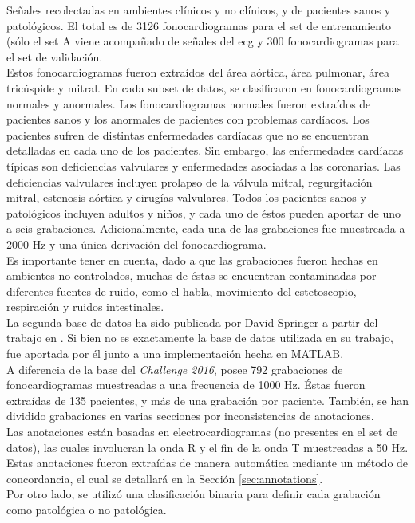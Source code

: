 \indent Señales recolectadas en ambientes clínicos y no clínicos, y de pacientes sanos y patológicos. El total es de 3126 fonocardiogramas para el set de entrenamiento (sólo el set A viene acompañado de señales del \acrshort{ecg} y 300 fonocardiogramas para el set de validación. \\
\indent Estos fonocardiogramas fueron extraídos del área aórtica, área pulmonar, área tricúspide y mitral. En cada subset de datos, se clasificaron en fonocardiogramas normales y anormales. Los fonocardiogramas normales fueron extraídos de pacientes sanos y los anormales de pacientes con problemas cardíacos. Los pacientes sufren de distintas enfermedades cardíacas que no se encuentran detalladas en cada uno de los pacientes. Sin embargo, las enfermedades cardíacas típicas son deficiencias valvulares y enfermedades asociadas a las coronarias. Las deficiencias valvulares incluyen prolapso de la válvula mitral, regurgitación mitral, estenosis aórtica y cirugías valvulares. Todos los pacientes sanos y patológicos incluyen adultos y niños, y cada uno de éstos pueden aportar de uno a seis grabaciones. Adicionalmente, cada una de las grabaciones fue muestreada a 2000 Hz y una única derivación del fonocardiograma. \\
\indent Es importante tener en cuenta, dado a que las grabaciones fueron hechas en ambientes no controlados, muchas de éstas se encuentran contaminadas por diferentes fuentes de ruido, como el habla, movimiento del estetoscopio, respiración y ruidos intestinales. \\
\indent La segunda base de datos ha sido publicada por David Springer a partir del trabajo en \cite{pp:springer2015}. Si bien no es exactamente la base de datos utilizada en su trabajo, fue aportada por él junto a una implementación hecha en \textsc{MATLAB\texttrademark}. \\
\indent A diferencia de la base del \textit{Challenge 2016}, posee 792 grabaciones de fonocardiogramas muestreadas a una frecuencia de 1000 Hz. Éstas fueron extraídas de 135 pacientes, y más de una grabación por paciente. También, se han dividido grabaciones en varias secciones por inconsistencias de anotaciones. \\
\indent Las anotaciones están basadas en electrocardiogramas (no presentes en el set de datos), las cuales involucran la onda R y el fin de la onda T muestreadas a 50 Hz. Estas anotaciones fueron extraídas de manera automática mediante un método de concordancia, el cual se detallará en la Sección \ref{sec:annotations}. \\
\indent Por otro lado, se utilizó una clasificación binaria para definir cada grabación como patológica o no patológica.

